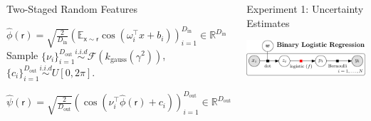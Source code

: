 \documentclass[english]{beamer}
\begin{document}
\begin{frame}
\begin{columns}[t]
\begin{block}{Two-Staged Random Features }
\begin{algorithmic}[1]
\STATE $\hat{\phi}(\mathsf{r}) = \sqrt{\frac{2}{D_\mathrm{in}}} \left(
\mathbb{E}_{\mathsf{x \sim \mathsf{r}}} 
\cos(\omega_{i}^{\top}x+b_{i} ) \right)_{i=1}^{D_\mathrm{in}} \in \mathbb{R}^{D_\mathrm{in}}$ \\
%
%
\STATE Sample $\{ \nu_i \}_{i=1}^{D_\mathrm{out}} \overset{i.i.d}{\sim}
\mathscr{F}({k}_{\text{gauss}}(\gamma^{2}))$, \hspace{2cm}
$\{c_i\}_{i=1}^{D_\mathrm{out}} \overset{i.i.d}{\sim} U[0, 2\pi] $.


\STATE $\hat{\psi}(\mathsf{r}) = \sqrt{\frac{2}{D_\mathrm{out}}} \left(  
\cos(\nu_{i}^{\top} \hat{\phi}(\mathsf{r}) + c_{i} ) \right)_{i=1}^{D_\mathrm{out}} \in 
\mathbb{R}^{D_\mathrm{out}}$
\end{algorithmic}

\end{block}


\begin{block}{ Experiment 1: Uncertainty Estimates}

\begin{center}
\includegraphics[width=19cm]{img/binlog_graph_title-crop}
\end{center}


\end{block}
\end{columns}
\end{frame}
\end{document}
